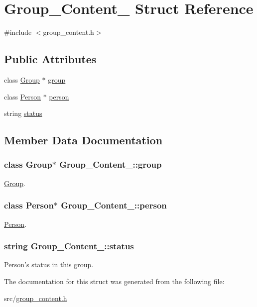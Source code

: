 \hypertarget{structGroup__Content__}{
\section{Group\_\-Content\_\- Struct Reference}
\label{d9/d96/structGroup__Content__}
}


{\ttfamily \#include $<$group\_\-content.h$>$}

\subsection*{Public Attributes}
\begin{DoxyCompactItemize}
\item 
class \hyperlink{classGroup}{Group} $\ast$ \hyperlink{structGroup__Content___aff21edda2f29d751074e18d71dbbc1e4}{group}
\item 
class \hyperlink{classPerson}{Person} $\ast$ \hyperlink{structGroup__Content___a71f0da92a56d69af4275f011d443fb09}{person}
\item 
string \hyperlink{structGroup__Content___acd55c0cc8ecafe72189cc849c07da3b3}{status}
\end{DoxyCompactItemize}


\subsection{Member Data Documentation}
\hypertarget{structGroup__Content___aff21edda2f29d751074e18d71dbbc1e4}{
\subsubsection[{group}]{\setlength{\rightskip}{0pt plus 5cm}class {\bf Group}$\ast$ {\bf Group\_\-Content\_\-::group}}}
\label{d9/d96/structGroup__Content___aff21edda2f29d751074e18d71dbbc1e4}
\hyperlink{classGroup}{Group}. \hypertarget{structGroup__Content___a71f0da92a56d69af4275f011d443fb09}{
\subsubsection[{person}]{\setlength{\rightskip}{0pt plus 5cm}class {\bf Person}$\ast$ {\bf Group\_\-Content\_\-::person}}}
\label{d9/d96/structGroup__Content___a71f0da92a56d69af4275f011d443fb09}
\hyperlink{classPerson}{Person}. \hypertarget{structGroup__Content___acd55c0cc8ecafe72189cc849c07da3b3}{
\subsubsection[{status}]{\setlength{\rightskip}{0pt plus 5cm}string {\bf Group\_\-Content\_\-::status}}}
\label{d9/d96/structGroup__Content___acd55c0cc8ecafe72189cc849c07da3b3}
Person's status in this group. 

The documentation for this struct was generated from the following file:\begin{DoxyCompactItemize}
\item 
src/\hyperlink{group__content_8h}{group\_\-content.h}\end{DoxyCompactItemize}
